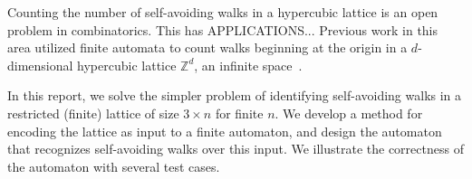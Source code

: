 Counting the number of self-avoiding walks in a hypercubic lattice is an open problem in combinatorics. This has APPLICATIONS... Previous work in this area utilized finite automata to count walks beginning at the origin in a $d$-dimensional hypercubic lattice $\mathbb{Z}^d$, an infinite space~\cite{ponitz:walks:ejc:2000}. 

In this report, we solve the simpler problem of identifying self-avoiding walks in a restricted (finite) lattice of size $3\times n$ for finite $n$. We develop a method for encoding the lattice as input to a finite automaton, and design the automaton that recognizes self-avoiding walks over this input. We illustrate the correctness of the automaton with several test cases.
